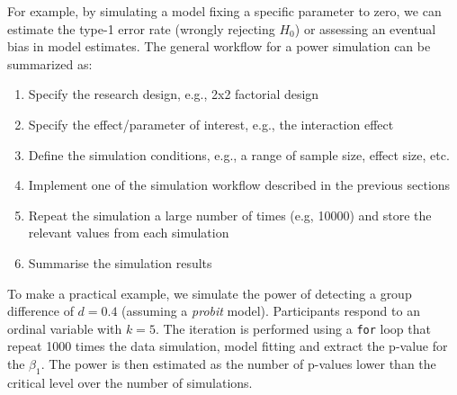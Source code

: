 \documentclass[
  man,floatsintext]{apa6}
\providecommand{\tightlist}{%
  \setlength{\itemsep}{0pt}\setlength{\parskip}{0pt}}
\begin{document}
For example, by simulating a model fixing a specific parameter to zero, we can estimate the type-1 error rate (wrongly rejecting \(H_0\)) or assessing an eventual bias in model estimates. The general workflow for a power simulation can be summarized as:

\begin{enumerate}
\def\labelenumi{\arabic{enumi}.}
\tightlist
\item
  Specify the research design, e.g., 2x2 factorial design
\item
  Specify the effect/parameter of interest, e.g., the interaction effect
\item
  Define the simulation conditions, e.g., a range of sample size, effect size, etc.
\item
  Implement one of the simulation workflow described in the previous sections
\item
  Repeat the simulation a large number of times (e.g, 10000) and store the relevant values from each simulation
\item
  Summarise the simulation results
\end{enumerate}

To make a practical example, we simulate the power of detecting a group difference of \(d = 0.4\) (assuming a \emph{probit} model). Participants respond to an ordinal variable with \(k = 5\). The iteration is performed using a \texttt{for} loop that repeat 1000 times the data simulation, model fitting and extract the p-value for the \(\beta_1\). The power is then estimated as the number of p-values lower than the critical level over the number of simulations.

\scriptsize
\end{document}
